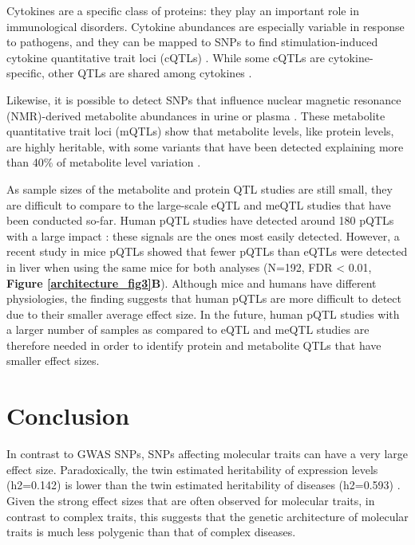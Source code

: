 Cytokines are a specific class of proteins: they play an important role in immunological disorders. Cytokine abundances are especially variable in response to pathogens, and they can be mapped to SNPs to find stimulation-induced cytokine quantitative trait loci (cQTLs) \cite{luMappingQuantitativeTrait2011,liInterindividualVariabilityGenetic2016}. While some cQTLs are cytokine-specific, other QTLs are shared among cytokines \cite{liInterindividualVariabilityGenetic2016}.

Likewise, it is possible to detect SNPs that influence nuclear magnetic resonance (NMR)-derived metabolite abundances in urine or plasma \cite{GenomeWideMetabolicQTL,shinAtlasGeneticInfluences2014}. These metabolite quantitative trait loci (mQTLs) show that metabolite levels, like protein levels, are highly heritable, with some variants that have been detected explaining more than 40\% of metabolite level variation \cite{GenomeWideMetabolicQTL}. 

As sample sizes of the metabolite and protein QTL studies are still small, they are difficult to compare to the large-scale eQTL and meQTL studies that have been conducted so-far. Human pQTL studies have detected around 180 pQTLs with a large impact \cite{wuVariationGeneticControl2013}: these signals are the ones most easily detected. However, a recent study in mice pQTLs \cite{chickDefiningConsequencesGenetic2016} showed that fewer pQTLs than eQTLs were detected in liver when using the same mice for both analyses (N=192, FDR < 0.01, \textbf{Figure \ref{architecture_fig3}B}). Although mice and humans have different physiologies, the finding suggests that human pQTLs are more difficult to detect due to their smaller average effect size. In the future, human pQTL studies with a larger number of samples as compared to eQTL and meQTL studies are therefore needed in order to identify protein and metabolite QTLs that have smaller effect sizes.


\section{Conclusion}
In contrast to GWAS SNPs, SNPs affecting molecular traits can have a very large effect size. Paradoxically, the twin estimated heritability of expression levels (h2=0.142) \cite{wrightHeritabilityGenomicsGene2014} is lower than the twin estimated heritability of diseases (h2=0.593) \cite{poldermanMetaanalysisHeritabilityHuman2015}. Given the strong effect sizes that are often observed for molecular traits, in contrast to complex traits, this suggests that the genetic architecture of molecular traits is much less polygenic than that of complex diseases. 

